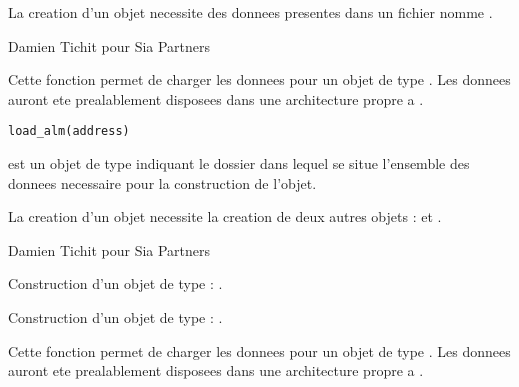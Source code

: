 \documentclass[a4paper]{book}
\begin{document}
%
\begin{Details}\relax
La creation d'un objet  necessite des donnees presentes dans un fichier nomme .
\end{Details}
%
\begin{Author}\relax
Damien Tichit pour Sia Partners
\end{Author}
%
\begin{Description}\relax
Cette fonction permet de charger les donnees pour un objet de type . Les donnees auront ete prealablement disposees dans
une architecture propre a .
\end{Description}
%
\begin{Usage}
\begin{verbatim}
load_alm(address)
\end{verbatim}
\end{Usage}
%
\begin{Arguments}
\begin{ldescription}
\item[\code{address}] est un objet de type  indiquant le dossier dans lequel se situe l'ensemble des donnees necessaire
pour la construction de l'objet.
\end{ldescription}
\end{Arguments}
%
\begin{Details}\relax
La creation d'un objet  necessite la creation de deux autres objets :  et .
\end{Details}
%
\begin{Author}\relax
Damien Tichit pour Sia Partners
\end{Author}
%
\begin{SeeAlso}\relax
Construction d'un objet de type  : .

Construction d'un objet de type  : .
\end{SeeAlso}
%
\begin{Description}\relax
Cette fonction permet de charger les donnees pour un objet de type . Les donnees auront ete prealablement disposees dans
une architecture propre a .
\end{Description}
\end{document}
